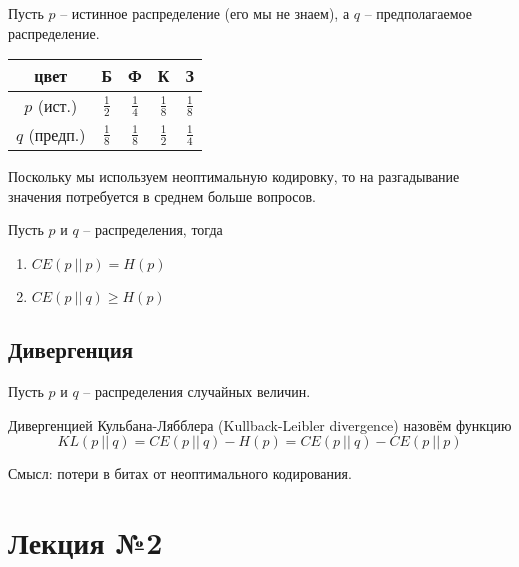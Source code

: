 \documentclass{article}
\begin{document}
\begin{example}
    Пусть $p$ -- истинное распределение (его мы не знаем), а $q$ -- предполагаемое распределение.

    \begin{center}
        \begin{tabular}{|c|c|c|c|c|}
            \hline
            цвет         & Б          & Ф          & К          & З          \\ \hline
            $p$ (ист.)   & $\frac 12$ & $\frac 14$ & $\frac 18$ & $\frac 18$ \\ \hline
            $q$ (предп.) & $\frac 18$ & $\frac 18$ & $\frac 12$ & $\frac 14$ \\ \hline
        \end{tabular}
    \end{center}

    Поскольку мы используем неоптимальную кодировку, то на разгадывание значения потребуется в среднем больше вопросов.
\end{example}

\begin{remark}
    Пусть $p$ и $q$ -- распределения, тогда

    \begin{enumerate}
        \item $CE(p\ ||\ p) = H(p)$
        \item $CE(p\ ||\ q) \geqslant H(p)$
    \end{enumerate}
\end{remark}

\subsection{Дивергенция}

Пусть $p$ и $q$ -- распределения случайных величин.

\begin{definition}
    Дивергенцией Кульбана-Лябблера (Kullback-Leibler divergence) назовём функцию
    \[
        KL(p\ ||\ q) = CE(p\ ||\ q) - H(p) = CE(p\ ||\ q) - CE(p\ ||\ p)
    \]

    \footnotesize{
        Смысл: потери в битах от неоптимального кодирования.
    }
\end{definition}

\section{Лекция №2}
\end{document}
